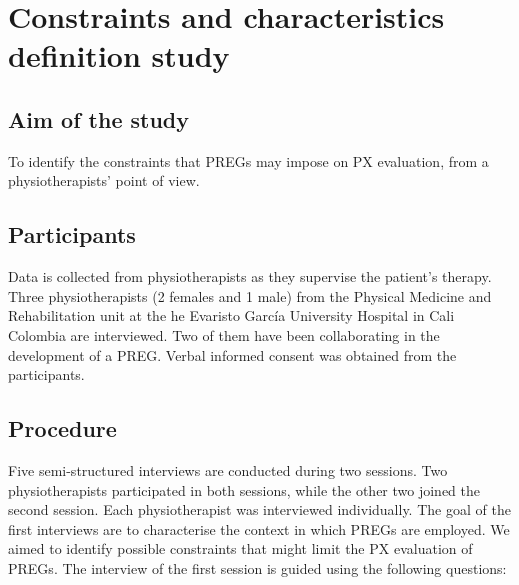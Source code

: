 \begin{table}[h]
\caption{Capabilities of each degree of autonomy of \acp{PREG}}
\label{tab:autonomy_dgree}
\myfloatalign
{}
\end{table}

\section{Constraints and characteristics definition study}\label{sec:study_char} %

\subsection{Aim of the study}
To identify the constraints that \acp{PREG} may impose on \ac{PX} evaluation, from a physiotherapists' point of view.

\subsection{Participants}
Data is collected from physiotherapists as they supervise the patient's therapy. Three physiotherapists (2 females and 1 male) from the Physical Medicine and Rehabilitation unit at the he Evaristo Garc\'ia University Hospital in Cali Colombia are interviewed. Two of them have been collaborating in the development of a \ac{PREG}. Verbal informed consent was obtained from the participants.

\subsection{Procedure}
Five semi-structured interviews are conducted during two sessions. Two physiotherapists participated in both sessions, while the other two joined the second session. Each physiotherapist was interviewed individually. The goal of the first interviews are to characterise the context in which \acp{PREG} are employed. We aimed to identify possible constraints that might limit the \ac{PX} evaluation of \acp{PREG}. The interview of the first session is guided using the following questions:

